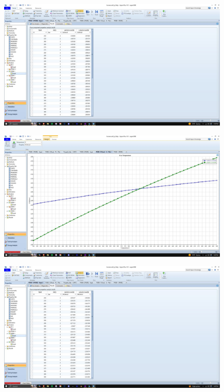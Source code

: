 \documentclass{article}
\begin{document}
\begin{figure}[H]
    \centering
    \includegraphics[width=0.99\textwidth, frame]{img/7 (H2bar table).JPG}
\end{figure}

\begin{figure}[H]
    \centering
    \includegraphics[width=0.99\textwidth, frame]{img/8 (G graph).JPG}
\end{figure}

\begin{figure}[H]
    \centering
    \includegraphics[width=0.99\textwidth, frame]{img/9 (G table).JPG}
\end{figure}
\end{document}
